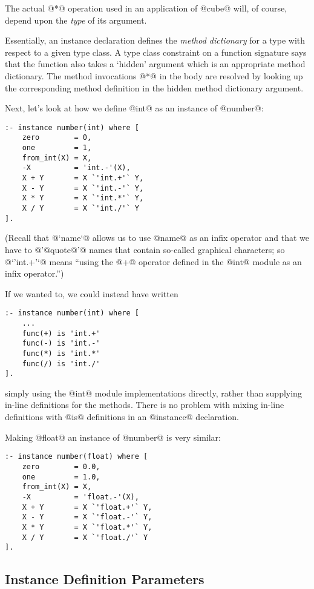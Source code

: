 The actual @*@ operation used in an application of @cube@ will, of
course, depend upon the \emph{type} of its argument.

Essentially, an instance declaration defines the \emph{method
dictionary} for a type with respect to a given type class.  A type
class constraint on a function signature says that the function also
takes a `hidden' argument which is an appropriate method dictionary.
The method invocations @*@ in the body are resolved by looking up
the corresponding method definition in the hidden method dictionary
argument.

Next, let's look at how we define @int@ as an instance of @number@:
\begin{verbatim}
:- instance number(int) where [
    zero        = 0,
    one         = 1,
    from_int(X) = X,
    -X          = 'int.-'(X),
    X + Y       = X `'int.+'` Y,
    X - Y       = X `'int.-'` Y,
    X * Y       = X `'int.*'` Y,
    X / Y       = X `'int./'` Y
].
\end{verbatim}
(Recall that @`name`@ allows us to use @name@ as an infix operator and
that we have to @'@quote@'@ names that contain so-called graphical
characters; so @`'int.+'`@ means ``using the @+@ operator defined in
the @int@ module as an infix operator.'')

If we wanted to, we could instead have written
\begin{verbatim}
:- instance number(int) where [
    ...
    func(+) is 'int.+'
    func(-) is 'int.-'
    func(*) is 'int.*'
    func(/) is 'int./'
].
\end{verbatim}
simply using the @int@ module implementations directly, rather than
supplying in-line definitions for the methods.  There is no problem
with mixing in-line definitions with @is@ definitions in an @instance@
declaration.

Making @float@ an instance of @number@ is very similar:
\begin{verbatim}
:- instance number(float) where [
    zero        = 0.0,
    one         = 1.0,
    from_int(X) = X,
    -X          = 'float.-'(X),
    X + Y       = X `'float.+'` Y,
    X - Y       = X `'float.-'` Y,
    X * Y       = X `'float.*'` Y,
    X / Y       = X `'float./'` Y
].
\end{verbatim}

\subsection{Instance Definition Parameters}

